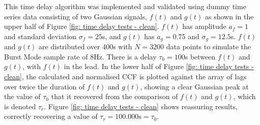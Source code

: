 This time delay algorithm was implemented and validated using dummy time series data consisting of two Gaussian signals, \(f(t)\) and \(g(t)\) as shown in the upper half of Figure \ref{fig: time delay tests - clean}. \(f(t)\) has amplitude \(a_f=1\) and standard deviation \(\sigma_f=25\)s, and \(g(t)\) has \(a_g=0.75\) and \(\sigma_g=12.5\)s. \(f(t)\) and \(g(t)\) are distributed over 400s with \(N=3200\) data points to simulate the Burst Mode sample rate of 8Hz. There is a delay \(\tau_0=100\)s between \(f(t)\) and \(g(t)\), with \(f(t)\) in the lead. In the lower half of Figure \ref{fig: time delay tests - clean}, the calculated and normalised CCF is plotted against the array of lags over twice the duration of \(f(t)\) and \(g(t)\), showing a clear Gaussian peak at the value of \(\tau_0\) that it recovered from the comparison of \(f(t)\) and \(g(t)\), which is denoted \(\tau_r\). Figure \ref{fig: time delay tests - clean} shows reassuring results, correctly recovering a value of \(\tau_r=100.000\textrm{s}=\tau_0\). 
\\

